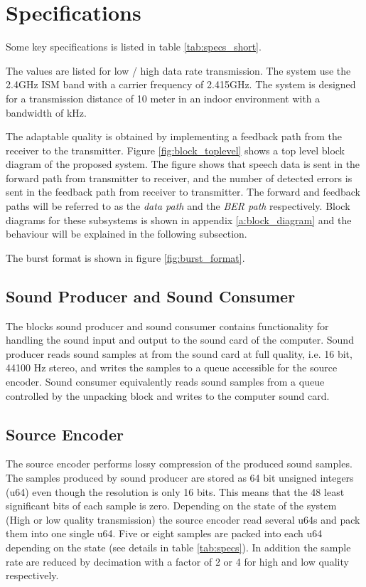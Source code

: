 \section{Specifications}
\label{sec:specifications}
Some key specifications is listed in table \ref{tab:specs_short}. 

The values are listed for low / high data rate transmission. The system use the 2.4GHz ISM band with a carrier frequency of 2.415GHz. The system is designed for a transmission distance of 10 meter in an indoor environment with a bandwidth of \bw kHz. 

The adaptable quality is obtained by implementing a feedback path from the receiver to the transmitter. Figure \ref{fig:block_toplevel} shows a top level block diagram of the proposed system. The figure shows that speech data is sent in the forward path from transmitter to receiver, and the number of detected errors is sent in the feedback path from receiver to transmitter. The forward and feedback paths will be referred to as the \textit{data path} and the \textit{BER path} respectively. Block diagrams for these subsystems is shown in appendix \ref{a:block_diagram} and the behaviour will be explained in the following subsection.


The burst format is shown in figure \ref{fig:burst_format}. 


\subsection{Sound Producer and Sound Consumer}
The blocks sound producer and sound consumer contains functionality for handling the sound input and output to the sound card of the computer. Sound producer reads sound samples at from the sound card at full quality, i.e. 16 bit, 44100 Hz stereo, and writes the samples to a queue accessible for the source encoder. Sound consumer equivalently reads sound samples from a queue controlled by the unpacking block and writes to the computer sound card.

\subsection{Source Encoder}
The source encoder performs lossy compression of the produced sound samples. The samples produced by sound producer are stored as 64 bit unsigned integers (u64) even though the resolution is only 16 bits. This means that the 48 least significant bits of each sample is zero. Depending on the state of the system (High or low quality transmission) the source encoder read several u64s and pack them into one single u64. Five or eight samples are packed into each u64 depending on the state (see details in table \ref{tab:specs}). In addition the sample rate are reduced by decimation with a factor of 2 or 4 for high and low quality respectively. 

